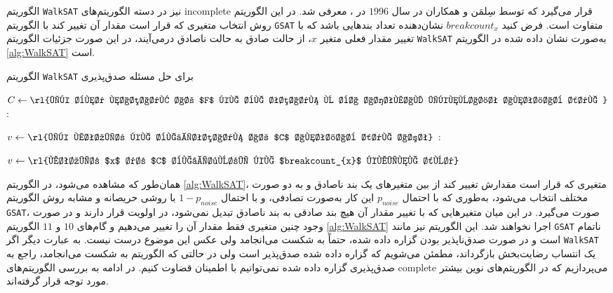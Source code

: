 الگوریتم 
\texttt{WalkSAT}
نیز در دسته الگوریتم‌های 
\gls*{incomplete}
قرار می‌گیرد  که  توسط سِلمَن و همکاران در سال 
$1996$ 
در 
\cite{WalkSAT1996}، 
معرفی شد.  در این الگوریتم روش انتخاب متغیری که قرار است مقدار آن تغییر کند با الگوریتم 
\texttt{GSAT} 
متفاوت است. فرض کنید 
$breakcount_{x}$
نشان‌دهنده تعداد بندهایی باشد که با تغییر مقدار فعلی متغیر 
$x$، 
از حالت صادق به حالت ناصادق  درمی‌آیند، در این صورت  جزئیات الگوریتم 
\texttt{WalkSAT}
 به‌صورت نشان داده شده در الگوریتم 
\ref{alg:WalkSAT}
است.  
\begin{algorithm}
	\renewcommand{\algorithmicrequire}{\textbf{Input:}}
	\renewcommand{\algorithmicensure}{\textbf{Output:}}
	\caption{الگوریتم  
		\texttt{WalkSAT}
		برای حل مسئله صدق‌پذیری}
	\label{alg:WalkSAT}
	\begin{latin}
		\begin{algorithmic}[1]
			\RETURN{$\sigma$} 
			\ENDIF		    
			\STATE $C\gets\text{\rl{یک بند ناصادق از 
				$F$
			که به  تصادف و با احتمال یکنواخت انتخاب شده }}$
\ELSE
\STATE{}:

					 \quad $v\gets\text{\rl{یک متغیر که به‌تصادف از 
					$C$
				انتخاب شده است}}$
\STATE{}:
		
		\quad$v\gets \text{\rl{متغیر
				$x$
				 در 
		$C$
	به‌طوری که 
$breakcount_{x}$
کمینه شود}}$ 
			\ENDIF			
		\ENDFOR
		\STATE{}
		\ENDFOR
		\end{algorithmic}
	\end{latin}
\end{algorithm}
همان‌طور که مشاهده می‌شود، در الگوریتم 
\ref{alg:WalkSAT}،
متغیری که قرار است مقدارش تغییر کند از بین متغیرهای یک بند ناصادق و به دو صورت مختلف انتخاب می‌شود، به‌طوری که با احتمال 
$p_{noise}$
این کار به‌صورت تصادفی، و با احتمال 
$1 - p_{noise}$
با روشی  حریصانه و مشابه روش الگوریتم 
\texttt{GSAT}، 
صورت می‌گیرد.  در این میان متغیرهایی که با تغییر مقدار آن هیچ  بند صادقی به بند ناصادق تبدیل نمی‌شود، در اولویت قرار دارند و در صورت وجود چنین متغیری فقط مقدار آن را تغییر می‌دهیم و   گام‌های 
$10$
و 
$11$
الگوریتم 
\ref{alg:WalkSAT}
اجرا نخواهند شد.  این الگوریتم نیز مانند 
\texttt{GSAT}
ناتمام است و در صورت صدق‌ناپذیر بودن گزاره داده شده، حتماً به شکست می‌انجامد ولی عکس این موضوع درست نیست. به عبارت دیگر اگر 
\texttt{WalkSAT}
یک انتساب رضایت‌بخش بازگرداند، مطمئن می‌شویم که گزاره داده شده صدق‌پذیر است ولی در حالتی که الگوریتم به شکست می‌انجامد، راجع به صدق‌پذیری گزاره داده شده نمی‌توانیم با اطمینان قضاوت کنیم.  در ادامه به بررسی الگوریتم‌های 
\gls*{complete}
می‌پردازیم که در الگوریتم‌های نوین بیشتر مورد توجه قرار گرفته‌اند. 
